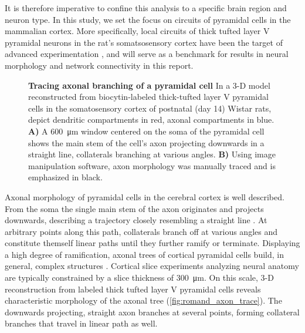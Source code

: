 It is therefore imperative to confine this analysis to a specific
brain region and neuron type. In this study, we set the focus on
circuits of pyramidal cells in the mammalian cortex.
More specifically, local circuits of thick tufted layer V
pyramidal neurons in the rat's somatsosensory cortex have been the
target of advanced
experimentation \parencite{Song2005,Perin2011,Romand2011, Ramaswamy2012}, and will
serve as a benchmark for results in neural morphology and network
connectivity in this report.

\begin{figure}[!htbp]
  \centering 
  \caption{\textbf{Tracing axonal branching of a pyramidal cell} In a
    3-D model reconstructed from biocytin-labeled thick-tufted layer V
    pyramidal cells in the somatosensory cortex of postnatal (day 14)
    Wistar rats, \textcite{Romand2011} depict dendritic compartments in
    red, axonal compartments in blue.  \textbf{A)} A
    \SI{600}{\micro\meter} window centered on the soma of the pyramidal
    cell shows the main stem of the cell's axon projecting downwards in a
    straight line, collaterals branching at various angles. \textbf{B)}
    Using image manipulation software, axon morphology was manually traced
    and is emphasized in black.}    
  \label{fig:romand_axon_trace}
\end{figure}
\vspace{-0.2cm}

Axonal morphology of pyramidal cells in the cerebral cortex is well
described. From the soma the single main stem of the axon
originates and projects downwards, describing a trajectory closely
resembling a straight line \parencite{Braitenberg_Cortex}. At
arbitrary points along this path, collaterals branch off at various
angles and constitute themself linear paths until they further ramify
or terminate. Displaying a high degree of ramification, axonal trees
of cortical pyramidal cells build, in general, complex
structures \parencite{Petersen2003,Ramaswamy2012}. Cortical slice
experiments analyzing neural anatomy are typically constrained by a
slice thickness of \SI{300}{\micro\meter}. On this scale, 3-D
reconstruction from labeled thick tufted layer V pyramidal cells
reveals characteristic morphology of the axonal tree
(\autoref{fig:romand_axon_trace}). The downwards projecting, straight
axon branches at several points, forming collateral branches that
travel in linear path as well.

